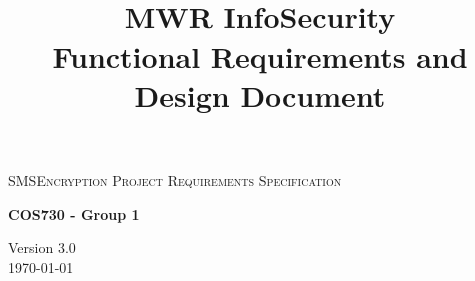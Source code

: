 \begin{titlepage}
\begin{center}

\textsc{\LARGE SMSEncryption Project Requirements Specification}

\textbf{COS730 - Group 1} \\

\title{
  \textbf{\\}
MWR InfoSecurity\\
Functional Requirements and Design Document\\
}

\vfill

{\large Version 3.0}
\\
{\large \today}

\end{center}
\end{titlepage}
